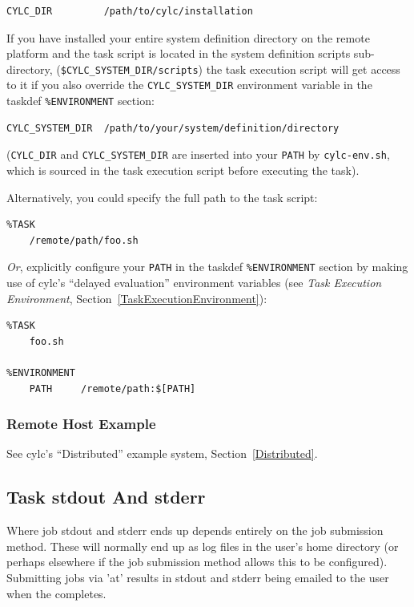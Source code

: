 \documentclass[11pt,a4paper]{article}
\begin{document}
\begin{lstlisting}
CYLC_DIR         /path/to/cylc/installation
\end{lstlisting}

If you have installed your entire system definition directory on the
remote platform and the task script is located in the 
system definition scripts sub-directory,
(\lstinline=$CYLC_SYSTEM_DIR/scripts=)
the task execution script will get access to it if you also override
the \lstinline=CYLC_SYSTEM_DIR= environment variable in the taskdef
\lstinline=%ENVIRONMENT= section:
\begin{lstlisting}
CYLC_SYSTEM_DIR  /path/to/your/system/definition/directory
\end{lstlisting}

(\lstinline=CYLC_DIR=  and \lstinline=CYLC_SYSTEM_DIR= are inserted
into your \lstinline=PATH= by \lstinline=cylc-env.sh=, which is sourced
in the task execution script before executing the task).

Alternatively, you could specify the full path to the task script:

\begin{lstlisting}
%TASK
    /remote/path/foo.sh
\end{lstlisting}

{\em Or}, explicitly configure your \lstinline=PATH= in the taskdef
\lstinline=%ENVIRONMENT= section by making use of cylc's ``delayed
evaluation'' environment variables (see {\em Task Execution
Environment}, Section~\ref{TaskExecutionEnvironment}):

\begin{lstlisting}
%TASK
    foo.sh

%ENVIRONMENT
    PATH     /remote/path:$[PATH]
\end{lstlisting}

\subsubsection{Remote Host Example}

See cylc's ``Distributed'' example system, Section~\ref{Distributed}.


\subsection{Task stdout And stderr}
\label{TaskstdoutAndstderr}

Where job stdout and stderr ends up depends entirely on the job
submission method. These will normally end up as log files in the user's
home directory (or perhaps elsewhere if the job submission method allows
this to be configured). Submitting jobs via 'at' results in stdout and
stderr being emailed to the user when the completes.
\end{document}
